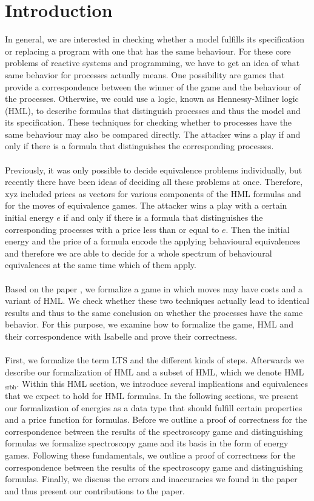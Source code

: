 \newpage
\section{Introduction} %
In general, we are interested in checking whether a model fulfills its specification or replacing a program with one that has the same behaviour.
For these core problems of reactive systems and programming, we have to get an idea of what same behavior for processes actually means.
One possibility are games that provide a correspondence between the winner of the game and the behaviour of the processes.
Otherwise, we could use a logic, known as Hennessy-Milner logic (HML), to describe formulas that distinguish processes and thus the model and its specification.
These techniques for checking whether to processes have the same behaviour may also be compared directly.
The attacker wins a play if and only if there is a formula that distinguishes the corresponding processes.
\\\\
Previously, it was only possible to decide equivalence problems individually, but recently there have been ideas of deciding all these problems at once.
Therefore, xyz included prices as vectors for various components of the HML formulas and for the moves of equivalence games.
The attacker wins a play with a certain initial energy $e$ if and only if there is a formula that distinguishes the corresponding processes with a price less than or equal to $e$.
Then the initial energy and the price of a formula encode the applying behavioural equivalences and therefore we are able to decide for a whole spectrum of behavioural equivalences at the same time which of them apply.
\\\\
Based on the paper \cite{bisping2023lineartimebranchingtime}, we formalize a game in which moves may have costs and a variant of HML.
We check whether these two techniques actually lead to identical results and thus to the same conclusion on whether the processes have the same behavior.
For this purpose, we examine how to formalize the game, HML and their correspondence with Isabelle and prove their correctness.
\\\\
First, we formalize the term LTS and the different kinds of steps.
Afterwards we describe our formalization of HML and a subset of HML, which we denote HML$_\text{srbb}$.
Within this HML section, we introduce several implications and equivalences that we expect to hold for HML formulas.
In the following sections, we present our formalization of energies as a data type that should fulfill certain properties and a price function for formulas.
Before we outline a proof of correctness for the correspondence between the results of the spectroscopy game and distinguishing formulas we formalize spectroscopy game and its basis in the form of energy games.
Following these fundamentals, we outline a proof of correctness for the correspondence between the results of the spectroscopy game and distinguishing formulas.
Finally, we discuss the errors and inaccuracies we found in the paper and thus present our contributions to the paper\cite{bisping2023lineartimebranchingtime}.